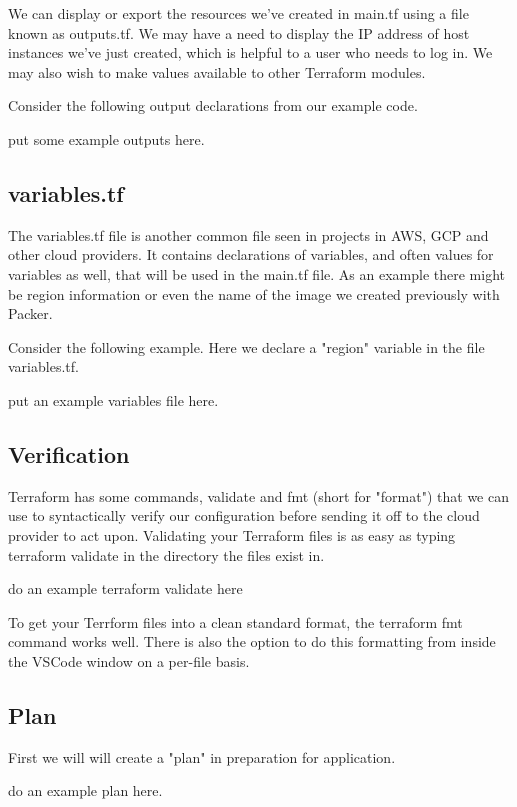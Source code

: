 \justify
We can display or export the resources we've created in main.tf using a
file known as outputs.tf. We may have a need to display the IP address
of host instances we've just created, which is helpful to a user who
needs to log in. We may also wish to make values available to other
Terraform modules.

\justify
Consider the following output declarations from our example code.

put some example outputs here.

\subsection{variables.tf}

\justify
The variables.tf file is another common file seen in projects in AWS,
GCP and other cloud providers. It contains declarations of variables,
and often values for variables as well, that will be used in the main.tf
file. As an example there might be region information or even the name
of the image we created previously with Packer.

\justify
Consider the following example. Here we declare a "region" variable in
the file variables.tf.

put an example variables file here.

\subsection{Verification}

\justify
Terraform has some commands, validate and fmt (short for "format") that
we can use to syntactically verify our configuration before sending it
off to the cloud provider to act upon. Validating your Terraform files
is as easy as typing terraform validate in the directory the files exist
in.

do an example terraform validate here

To get your Terrform files into a clean standard format, the
terraform fmt command works well. There is also the option to do this
formatting from inside the VSCode window on a per-file basis.

\subsection{Plan}

First we will will create a "plan" in preparation for application.

do an example plan here.

